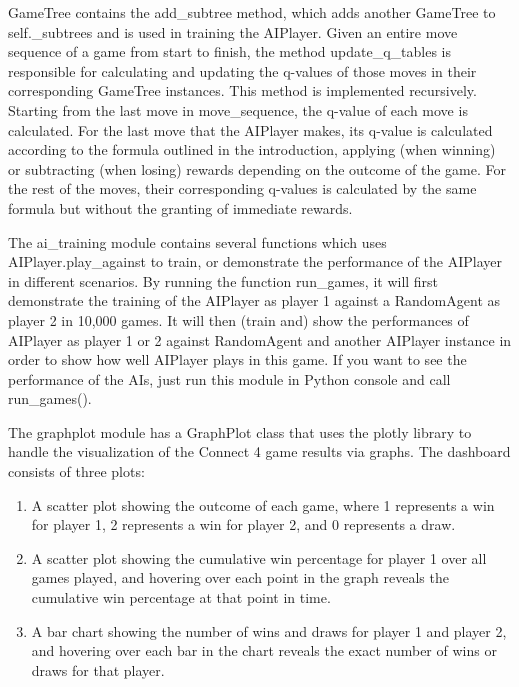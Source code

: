 \documentclass{article}
\begin{document}
GameTree contains the add\_subtree method, which adds another GameTree to self.\_subtrees and is used in training the AIPlayer. Given an entire move sequence of a game from start to finish, the method update\_q\_tables is responsible for calculating and updating the q-values of those moves in their corresponding GameTree instances. This method is implemented recursively. Starting from the last move in move\_sequence, the q-value of each move is calculated. For the last move that the AIPlayer makes, its q-value is calculated according to the formula outlined in the introduction, applying (when winning) or subtracting (when losing) rewards depending on the outcome of the game. For the rest of the moves, their corresponding q-values is calculated by the same formula but without the granting of immediate rewards. 

\bigskip

The ai\_training module contains several functions which uses AIPlayer.play\_against to train, or demonstrate the performance of the AIPlayer in different scenarios. By running the function run\_games, it will first demonstrate the training of the AIPlayer as player 1 against a RandomAgent as player 2 in 10,000 games. It will then (train and) show the performances of AIPlayer as player 1 or 2 against RandomAgent and another AIPlayer instance in order to show how well AIPlayer plays in this game. If you want to see the performance of the AIs, just run this module in Python console and call run\_games().

\bigskip

The graphplot module has a GraphPlot class that uses the plotly library to handle the visualization of the Connect 4 game results via graphs. The dashboard consists of three plots:

\begin{enumerate}
    \item A scatter plot showing the outcome of each game, where 1 represents a win for player 1, 2 represents a win for player 2, and 0 represents a draw. 
    \item A scatter plot showing the cumulative win percentage for player 1 over all games played, and hovering over each point in the graph reveals the cumulative win percentage at that point in time.
    \item A bar chart showing the number of wins and draws for player 1 and player 2, and hovering over each bar in the chart reveals the exact number of wins or draws for that player.
\end{enumerate}
\end{document}
